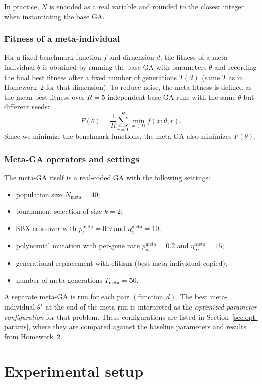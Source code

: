 \documentclass[11pt]{article}
\begin{document}
In practice, $N$ is encoded as a real variable and rounded to the closest
integer when instantiating the base GA.

\subsubsection*{Fitness of a meta-individual}

For a fixed benchmark function $f$ and dimension $d$, the fitness of a
meta-individual $\theta$ is obtained by running the base GA with parameters
$\theta$ and recording the final best fitness after a fixed number of
generations $T(d)$ (same $T$ as in Homework~2 for that dimension).
To reduce noise, the meta-fitness is defined as the mean best fitness over
$R=5$ independent base-GA runs with the same $\theta$ but different seeds:
\[
  F(\theta) = \frac{1}{R} \sum_{r=1}^{R}
    \min_{x \in D} f(x; \theta, r).
\]
Since we minimize the benchmark functions, the meta-GA also minimizes
$F(\theta)$.

\subsubsection*{Meta-GA operators and settings}

The meta-GA itself is a real-coded GA with the following settings:
\begin{itemize}
  \item population size $N_{\text{meta}} = 40$;
  \item tournament selection of size $k=2$;
  \item SBX crossover with $p_c^{\text{meta}} = 0.9$ and
        $\eta_c^{\text{meta}} = 10$;
  \item polynomial mutation with per-gene rate
        $p_m^{\text{meta}} = 0.2$ and
        $\eta_m^{\text{meta}} = 15$;
  \item generational replacement with elitism (best meta-individual copied);
  \item number of meta-generations $T_{\text{meta}} = 50$.
\end{itemize}

A separate meta-GA is run for each pair $(\text{function}, d)$.
The best meta-individual $\theta^\star$ at the end of the meta-run is
interpreted as the \emph{optimized parameter configuration} for that
problem.
These configurations are listed in Section~\ref{sec:opt-params}, where they
are compared against the baseline parameters and results from Homework~2.

\section{Experimental setup}
\end{document}
